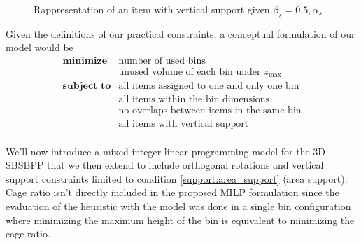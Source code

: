 \begin{figure}[H]
    \scalebox{0.55}{%
    
    }
    \caption{Rappresentation of an item with vertical support given $\beta_s = 0.5, \alpha_s$}
    \label{fig:support}
\end{figure}

\newpage
Given the definitions of our practical constraints, a conceptual formulation of our model would be
\begin{eqnarray*}
    \textbf{minimize} & \text{number of used bins} \\
                        & \text{unused volume of each bin under $z_\text{max}$} \\
    \textbf{subject to} & \text{all items assigned to one and only one bin} \\
                                      & \text{all items within the bin dimensions} \\
                                      & \text{no overlaps between items in the same bin} \\
                                      & \text{all items with vertical support} \\
\end{eqnarray*}

We'll now introduce a mixed integer linear programming model for the 3D-SBSBPP that we then extend to include orthogonal rotations and vertical support constraints limited to condition \ref{support:area_support} (area support).
Cage ratio isn't directly included in the proposed MILP formulation since the evaluation of the heuristic with the model was done in a single bin configuration where minimizing the maximum height of the bin is equivalent to minimizing the cage ratio.

